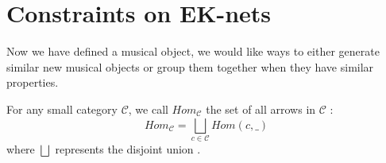 






\section{Constraints on EK-nets}


Now we have defined a musical object, we would like ways to either generate similar new musical objects or group them together when they have similar properties.

\begin{defn}
    For any small category $\mathcal{C}$, we call $Hom_\mathcal{C}$ the set of all arrows in $\mathcal{C}$ :
    $$Hom_\mathcal{C} = \bigsqcup_{c\in\mathcal{C}}Hom(c,\_)$$
    where $\bigsqcup$ represents the disjoint union \label{nomencl:sq-cup}.
\end{defn}


